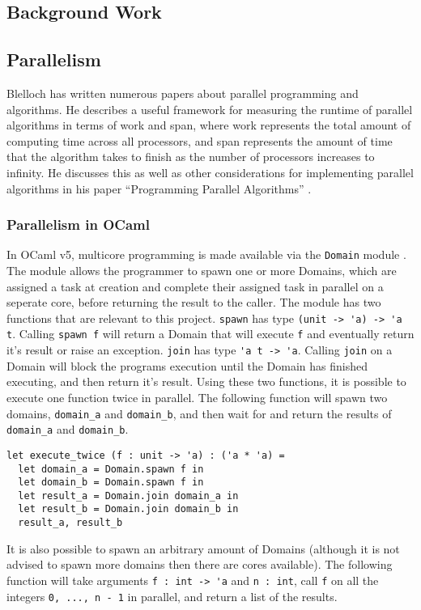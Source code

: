 \documentclass[pageno]{jpaper}
\begin{document}
\begin{doublespacing}
\section{Background Work}
\subsection{Parallelism}
Blelloch has written numerous papers about parallel programming and algorithms. He describes a useful framework for measuring the runtime of parallel algorithms in terms of work and span, where work represents the total amount of computing time across all processors, and span represents the amount of time that the algorithm takes to finish as the number of processors increases to infinity. He discusses this as well as other considerations for implementing parallel algorithms in his paper “Programming Parallel Algorithms” \cite{blelloch}.

\subsubsection{Parallelism in OCaml}
In OCaml v5, multicore programming is made available via the \verb|Domain| module \cite{ocaml-docs-domain}. The module allows the programmer to spawn one or more Domains, which are assigned a task at creation and complete their assigned task in parallel on a seperate core, before returning the result to the caller. The module has two functions that are relevant to this project. \verb|spawn| has type \verb|(unit -> 'a) -> 'a t|. Calling \verb|spawn f| will return a Domain that will execute \verb|f| and eventually return it's result or raise an exception. \verb|join| has type \verb|'a t -> 'a|. Calling \verb|join| on a Domain will block the programs execution until the Domain has finished executing, and then return it's result. Using these two functions, it is possible to execute one function twice in parallel. The following function will spawn two domains, \verb|domain_a| and \verb|domain_b|, and then wait for and return the results of \verb|domain_a| and  \verb|domain_b|.

\begin{verbatim}
let execute_twice (f : unit -> 'a) : ('a * 'a) =
  let domain_a = Domain.spawn f in
  let domain_b = Domain.spawn f in
  let result_a = Domain.join domain_a in
  let result_b = Domain.join domain_b in
  result_a, result_b
\end{verbatim}

It is also possible to spawn an arbitrary amount of Domains (although it is not advised to spawn more domains then there are cores available). The following function will take arguments \verb|f : int -> 'a| and \verb|n : int|, call \verb|f| on all the integers \verb|0, ..., n - 1| in parallel, and return a list of the results.


\end{doublespacing}
\end{document}
